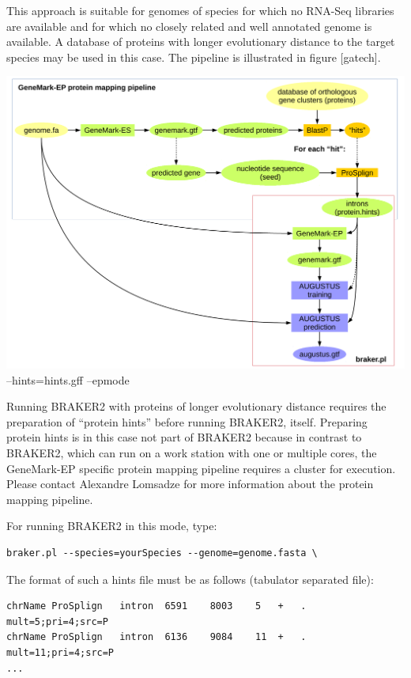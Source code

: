 \documentclass[]{article}
\begin{document}
This approach is suitable for genomes of species for which no RNA-Seq
libraries are available and for which no closely related and well
annotated genome is available. A database of proteins with longer
evolutionary distance to the target species may be used in this case.
The pipeline is illustrated in figure {[}gatech{]}.

\includegraphics{./figs/gatech-prot-pipeline.pdf} --hints=hints.gff
--epmode

Running BRAKER2 with proteins of longer evolutionary distance requires
the preparation of ``protein hints'' before running BRAKER2, itself.
Preparing protein hints is in this case not part of BRAKER2 because in
contrast to BRAKER2, which can run on a work station with one or
multiple cores, the GeneMark-EP specific protein mapping pipeline
requires a cluster for execution. Please contact Alexandre Lomsadze for
more information about the protein mapping pipeline.

For running BRAKER2 in this mode, type:

\begin{verbatim}
braker.pl --species=yourSpecies --genome=genome.fasta \
\end{verbatim}

The format of such a hints file must be as follows (tabulator separated
file):

\begin{verbatim}
chrName ProSplign   intron  6591    8003    5   +   .   mult=5;pri=4;src=P
chrName ProSplign   intron  6136    9084    11  +   .   mult=11;pri=4;src=P
...
\end{verbatim}
\end{document}
